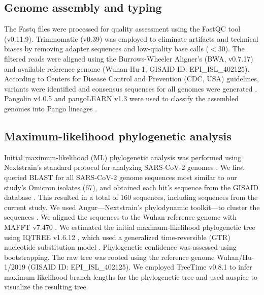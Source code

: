 \subsection{Genome assembly and typing}\label{2:mm-assembly}
The Fastq files were processed for quality assessment using the FastQC tool (v0.11.9)\citep{andrews2010fastqc}.
Trimmomatic (v0.39) \citep{bolger2014trimmomatic} was employed to eliminate artifacts and technical biases by removing adapter sequences and low-quality base calls ($<30$).
The filtered reads were aligned using the Burrows-Wheeler Aligner's (BWA, v0.7.17) \citep{li2010fast} and available reference genome (Wuhan-Hu-1, GISAID ID: EPI\_ISL\_402125).
According to Centers for Disease Control and Prevention (CDC, USA) guidelines, variants were identified and consensus sequences for all genomes were generated \citep{paden2020rapid}.
Pangolin v4.0.5 and pangoLEARN v1.3 were used to classify the assembled genomes into Pango lineages \citep{rambaut2020dynamic,o2021assignment}.


\subsection{Maximum-likelihood phylogenetic analysis}\label{2:mm-ml}
Initial maximum-likelihood (ML) phylogenetic analysis was performed using Nextstrain's standard protocol for analyzing SARS-CoV-2 genomes \citep{hadfield2018nextstrain}.
We first queried BLAST for all SARS-CoV-2 genome sequences most similar to our study's Omicron isolates (67), and obtained each hit's sequence from the GISAID database \citep{shu2017gisaid}. 
This resulted in a total of 160 sequences, including sequences from the current study. 
We used Augur---Nextstrain's phylodynamic toolkit---to cluster the sequences \citep{huddleston2021augur}.
We aligned the sequences to the Wuhan reference genome with MAFFT v7.470 \citep{katoh2002mafft}.
We estimated the initial maximum-likelihood phylogenetic tree using IQTREE v1.6.12 \citep{nguyen2015iq}, which used a generalized time-reversible (GTR) nucleotide substitution model \citep{tavare1986some, yang1994estimating, zharkikh1994estimation}.
Phylogenetic confidence was assessed using bootstrapping.
The raw tree was rooted using the reference genome Wuhan/Hu-1/2019 (GISAID ID: EPI\_ISL\_402125).
We employed TreeTime v0.8.1 to infer maximum likelihood branch lengths for the phylogenetic tree \citep{sagulenko2018treetime} and used auspice \citep{hadfield2018nextstrain} to visualize the resulting tree.



